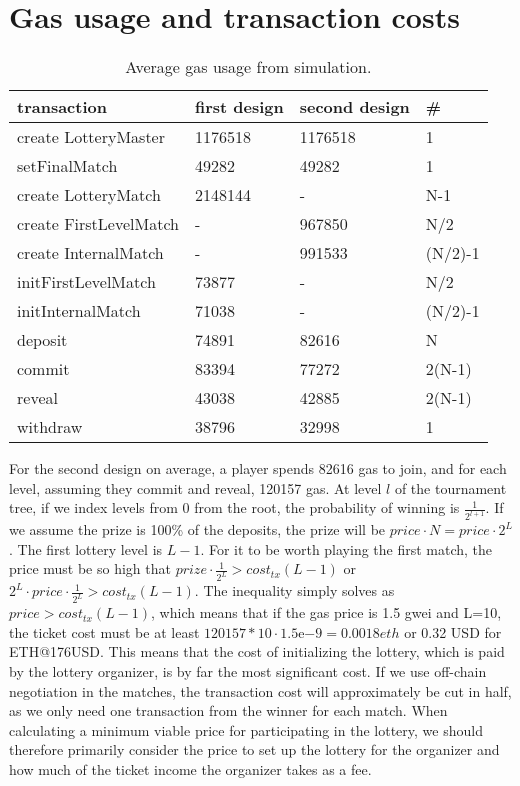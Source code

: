 \section{Gas usage and transaction costs}
\label{sec:gas}

\begin{table}[h]
\centering
\caption{Average gas usage from simulation.}
\label{table:gas-usage}
\begin{tabular}{|l|l|l|l|}
\hline

transaction & first design & second design & \# \\ \hline
create LotteryMaster & 1176518 & 1176518 & 1 \\ \hline
setFinalMatch & 49282 & 49282 & 1 \\ \hline
create LotteryMatch & 2148144 & - & N-1 \\ \hline
create FirstLevelMatch & - & 967850 & N/2 \\ \hline
create InternalMatch & - & 991533 & (N/2)-1 \\ \hline
initFirstLevelMatch & 73877 & - & N/2 \\ \hline
initInternalMatch & 71038 & - & (N/2)-1 \\ \hline
deposit & 74891 & 82616 & N \\ \hline
commit & 83394 & 77272 & 2(N-1) \\ \hline
reveal & 43038 & 42885 & 2(N-1) \\ \hline
withdraw & 38796 & 32998 & 1 \\ \hline

\end{tabular}
\end{table}

\noindent
For the second design on average, a player spends 82616 gas to join, and for each level, assuming they commit and reveal, 120157 gas. At level $l$ of the tournament tree, if we index levels from 0 from the root, the probability of winning is $\frac{1}{2^{l+1}}$. If we assume the prize is 100\% of the deposits, the prize will be $price \cdot N=price \cdot 2^L$. The first lottery level is $L-1$. For it to be worth playing the first match, the price must be so high that $prize \cdot \frac{1}{2^L} > cost_{tx}(L-1)$ or $2^L \cdot price \cdot \frac{1}{2^L} > cost_{tx}(L-1)$. The inequality simply solves as $price > cost_{tx}(L-1)$, which means that if the gas price is 1.5 gwei and L=10, the ticket cost must be at least $120157 * 10 \cdot 1.5 \mathrm{e}{-9}=0.0018 eth$ or 0.32 USD for ETH@176USD. 
This means that the cost of initializing the lottery, which is paid by the lottery organizer, is by far the most significant cost. If we use off-chain negotiation in the matches, the transaction cost will approximately be cut in half, as we only need one transaction from the winner for each match. When calculating a minimum viable price for participating in the lottery, we should therefore primarily consider the price to set up the lottery for the organizer and how much of the ticket income the organizer takes as a fee.

